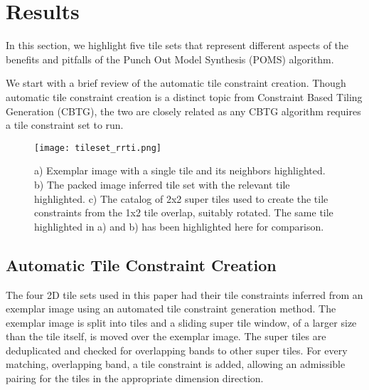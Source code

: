 \section{Results}

In this section, we highlight five tile sets that represent different aspects of the
benefits and pitfalls of the Punch Out Model Synthesis (POMS) algorithm.

We start with a brief review of the automatic tile constraint creation.
Though automatic tile constraint creation is a distinct topic from Constraint Based
Tiling Generation (CBTG), the two are closely related as any CBTG algorithm requires
a tile constraint set to run.

\begin{figure}[h]
  \texttt{[image: tileset\_rrti.png]}
  \caption{ a) Exemplar image with a single tile and its neighbors highlighted. b) The packed image inferred tile set with the relevant tile highlighted.
            c) The catalog of 2x2 super tiles used to create the tile constraints from the 1x2 tile overlap, suitably rotated. The same tile highlighted in a) and b) has been highlighted here for comparison. }
  \label{fig:rrti_tileset}
\end{figure}


\subsection{Automatic Tile Constraint Creation}

The four 2D tile sets used in this paper had their tile constraints inferred from an exemplar image using
an automated tile constraint generation method.
The exemplar image is split into tiles and a sliding super tile window, of a larger size than the tile itself, is moved over the exemplar image.
The super tiles are deduplicated and checked for overlapping bands to other super tiles.
For every matching, overlapping band, a tile constraint is added, allowing an admissible pairing for the tiles in the
appropriate dimension direction.

